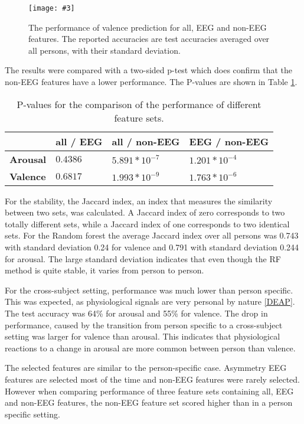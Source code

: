 \documentclass[12pt,journal,compsoc]{IEEEtran}
\newcommand{\npar}{\par \vspace{2.3ex plus 0.3ex minus 0.3ex}}
\newcommand{\mijnfiguur}[4][H]{            %
    \begin{figure}[#1]                      %
        \begin{center}                      %
            \texttt{[image: \#3]}        %
            \caption{#4\label{#3}}          %
        \end{center}
    \end{figure}
    }
\begin{document}
\mijnfiguur{width=.5\textwidth}{valencephyeegall}{The performance of valence prediction for all, EEG and non-EEG features. The reported accuracies are test accuracies averaged over all persons, with their standard deviation.}

The results were compared with a two-sided p-test which does confirm that the non-EEG features have a lower performance. The P-values are shown in Table \ref{pvals}.
\begin{table}[H]
\centering
\caption{P-values for the comparison of the performance of different feature sets.\label{pvals}}
\begin{tabular}{l|lll}
	    		 & \textbf{all / EEG} & \textbf{all / non-EEG} & \textbf{EEG / non-EEG} \\ \hline
\textbf{Arousal} & $0.4386$          & $5.891 * 10^{-7}$  & $1.201 * 10^{-4}$ \\
\textbf{Valence} & $0.6817$          & $1.993 * 10^{-9}$  & $1.763 * 10^{-6}$                 
\end{tabular}
\end{table}

For the stability, the Jaccard index, an index that measures the similarity between two sets, was calculated. A Jaccard index of zero corresponds to two totally different sets, while a Jaccard index of one corresponds to two identical sets. For the Random forest the average Jaccard index over all persons was 0.743 with standard deviation 0.24 for valence and 0.791 with standard deviation 0.244 for arousal. The large standard deviation indicates that even though the RF method is quite stable, it varies from person to person.

\npar

For the cross-subject setting, performance was much lower than person specific. This was expected, as physiological signals are very personal by nature \ref{DEAP}. The test accuracy was 64\% for arousal and 55\% for valence. The drop in performance, caused by the transition from person specific to a cross-subject setting was larger for valence than arousal. This indicates that physiological reactions to a change in arousal are more common between person than valence. 

\npar

The selected features are similar to the person-specific case. Asymmetry EEG features are selected most of the time and non-EEG features were rarely selected. However when comparing performance of three feature sets containing all, EEG and non-EEG features, the non-EEG feature set scored higher than in a person specific setting.
\end{document}
